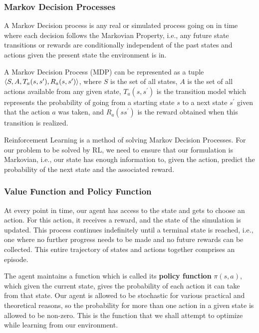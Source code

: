 \subsubsection{Markov Decision Processes}

A Markov Decision process is any real or simulated process going on in time where each decision follows the Markovian Property, i.e., any future state transitions or rewards are conditionally independent of the past states and actions given the present state the environment is in.

A Markov Decision Process (MDP) can be represented as a tuple $\braket{S, A, T_a(s, s^\prime), R_a(s, s^\prime)}$, where $S$ is the set of all states, $A$ is the set of all actions available from any given state, $T_a(s, s^\prime)$ is the transition model which represents the probability of going from a starting state $s$ to a next state $s^\prime$ given that the action $a$ was taken, and $R_a(s s^\prime)$ is the reward obtained when this transition is realized.

Reinforcement Learning is a method of solving Markov Decision Processes. For our problem to be solved by RL, we need to ensure that our formulation is Markovian, i.e., our state has enough information to, given the action, predict the probability of the next state and the associated reward.

\subsubsection{Value Function and Policy Function}

At every point in time, our agent has access to the state and gets to choose an action. For this action, it receives a reward, and the state of the simulation is updated. 
This process continues indefinitely until a terminal state is reached, i.e., one where no further progress needs to be made and no future rewards can be collected. This entire trajectory of states and actions together comprises an episode.

The agent maintains a function which is called its \textbf{policy function} $\pi(s, a)$, which given the current state, gives the probability of each action it can take from that state. Our agent is allowed to be stochastic for various practical and theoretical reasons, so the probability for more than one action in a given state is allowed to be non-zero. This is the function that we shall attempt to optimize while learning from our environment.

